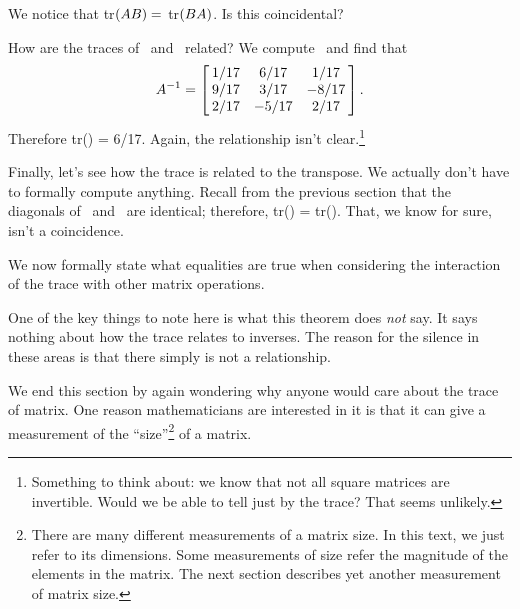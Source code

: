 We notice that tr$(\tta\ttb) = $ tr$(\ttb\tta)$. Is this coincidental?
 
How are the traces of \tta\ and \ttai\ related? We compute \ttai\ and find that $$\ttai = \bmx{ccc} 1/17 & 6/17 & 1/17\\9/17 & 3/17 & -8/17\\ 2/17 & -5/17 & 2/17 \emx.$$ Therefore tr(\ttai) = 6/17. Again, the relationship isn't clear.\footnote{Something to think about: we know that not all square matrices are invertible. Would we be able to tell just by the trace? That seems unlikely.}

Finally, let's see how the trace is related to the transpose. We actually don't have to formally compute anything. Recall from the previous section that the diagonals of \tta\ and \ttat\ are identical; therefore, tr(\tta) = tr(\ttat). That, we know for sure, isn't a coincidence.

We now formally state what equalities are true when considering the interaction of the trace with other matrix operations.


One of the key things to note here is what this theorem does \textit{not} say. %
It says nothing about how the trace relates to inverses. The reason for the silence in these areas is that there simply is not a relationship. 

We end this section by again wondering why anyone would care about the trace of matrix. One reason mathematicians are interested in it is that it can give a measurement of the ``size''\footnote{There are many different measurements of a matrix size. In this text, we just refer to its dimensions. Some measurements of size refer the magnitude of the elements in the matrix. The next section describes yet another measurement of matrix size.} of a matrix. 

